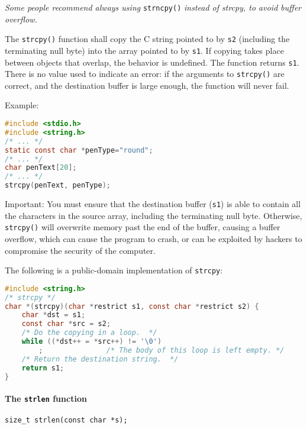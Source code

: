 \emph{Some people recommend always using} \texttt{strncpy()} \emph{instead of
strcpy, to avoid buffer overflow.}

The \texttt{strcpy()} function shall copy the C string pointed to by
\texttt{s2} (including the terminating null byte) into the array pointed to by
\texttt{s1}. If copying takes place between objects that overlap, the behavior
is undefined. The function returns \texttt{s1}. There is no value used to
indicate an error: if the arguments to \texttt{strcpy()} are correct, and the
destination buffer is large enough, the function will never fail.

Example:
\lstset{basicstyle=\scriptsize, numbers=left, captionpos=b, tabsize=4}
\begin{lstlisting}[caption=Section \thesection listing \arabic{stringcnt},language={C},
breaklines=true,xleftmargin=15pt,label=lst:section\thesection listing\arabic{stringcnt}]
#include <stdio.h>
#include <string.h>
/* ... */
static const char *penType="round";
/* ... */
char penText[20];
/* ... */
strcpy(penText, penType);
\end{lstlisting}

Important: You must ensure that the destination buffer (\texttt{s1}) is able to
contain all the characters in the source array, including the terminating null
byte. Otherwise, \texttt{strcpy()} will overwrite memory past the end of the
buffer, causing a buffer overflow, which can cause the program to crash, or can
be exploited by hackers to compromise the security of the computer.

The following is a public-domain implementation of \texttt{strcpy}:
\lstset{basicstyle=\scriptsize, numbers=left, captionpos=b, tabsize=4}
\begin{lstlisting}[caption=Section \thesection listing \arabic{stringcnt},language={C},
breaklines=true,xleftmargin=15pt,label=lst:section\thesection listing\arabic{stringcnt}]
#include <string.h>
/* strcpy */
char *(strcpy)(char *restrict s1, const char *restrict s2) {
	char *dst = s1;
	const char *src = s2;
	/* Do the copying in a loop.  */
	while ((*dst++ = *src++) != '\0')
	    ;               /* The body of this loop is left empty. */
	/* Return the destination string.  */
	return s1;
}
\end{lstlisting}

\paragraph{The \texttt{strlen} function}
\texttt{size\_t strlen(const char *s);}


